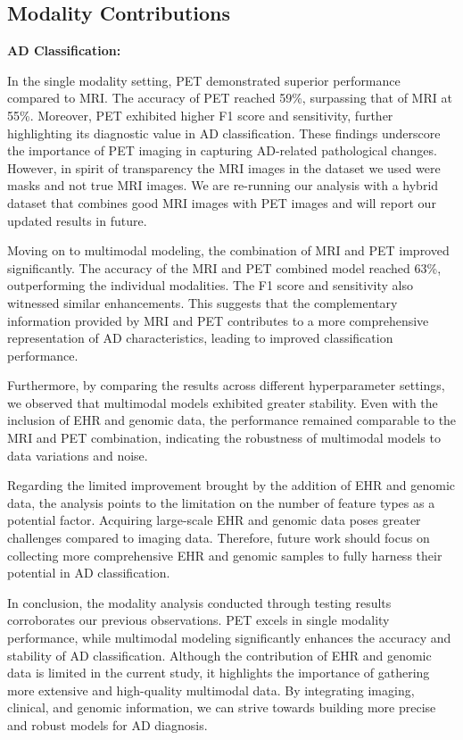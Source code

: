 \subsection{Modality Contributions} 

\textbf{AD Classification: }

In the single modality setting, PET demonstrated superior performance compared to MRI. The accuracy of PET reached 59\%, surpassing that of MRI at 55\%. Moreover, PET exhibited higher F1 score and sensitivity, further highlighting its diagnostic value in AD classification. These findings underscore the importance of PET imaging in capturing AD-related pathological changes. However, in spirit of transparency the MRI images in the dataset we used were masks and not true MRI images. We are re-running our analysis with a hybrid dataset that combines good MRI images with PET images and will report our updated results in future.  

Moving on to multimodal modeling, the combination of MRI and PET improved significantly. The accuracy of the MRI and PET combined model reached 63\%, outperforming the individual modalities. The F1 score and sensitivity also witnessed similar enhancements. This suggests that the complementary information provided by MRI and PET contributes to a more comprehensive representation of AD characteristics, leading to improved classification performance. 

Furthermore, by comparing the results across different hyperparameter settings, we observed that multimodal models exhibited greater stability. Even with the inclusion of EHR and genomic data, the performance remained comparable to the MRI and PET combination, indicating the robustness of multimodal models to data variations and noise. 

Regarding the limited improvement brought by the addition of EHR and genomic data, the analysis points to the limitation on the number of feature types  as a potential factor. Acquiring large-scale EHR and genomic data poses greater challenges compared to imaging data. Therefore, future work should focus on collecting more comprehensive EHR and genomic samples to fully harness their potential in AD classification. 

In conclusion, the modality analysis conducted through testing results corroborates our previous observations. PET excels in single modality performance, while multimodal modeling significantly enhances the accuracy and stability of AD classification. Although the contribution of EHR and genomic data is limited in the current study, it highlights the importance of gathering more extensive and high-quality multimodal data. By integrating imaging, clinical, and genomic information, we can strive towards building more precise and robust models for AD diagnosis. 

